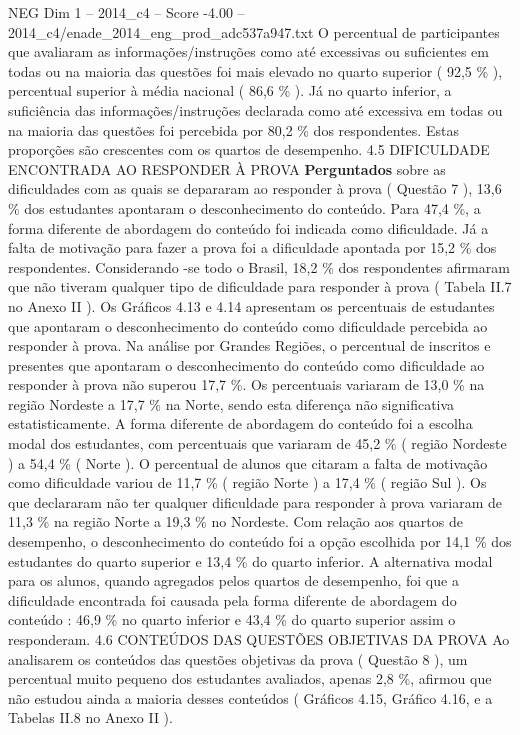 \begin{textsample}{NEG Dim 1 – 2014\_c4 – Score -4.00 – 2014\_c4/enade\_2014\_eng\_prod\_adc537a947.txt}
O percentual de participantes que avaliaram as informações/instruções como até excessivas ou suficientes em todas ou na maioria das questões foi mais elevado no quarto superior ( 92,5 \% ), percentual superior à média nacional ( 86,6 \% ).
Já no quarto inferior, a suficiência das informações/instruções declarada como até excessiva em todas ou na maioria das questões foi percebida por 80,2 \% dos respondentes.
Estas proporções são crescentes com os quartos de desempenho. 4.5 DIFICULDADE ENCONTRADA AO RESPONDER À PROVA \textbf{Perguntados} sobre as dificuldades com as quais se depararam ao responder à prova ( Questão 7 ), 13,6 \% dos estudantes apontaram o desconhecimento do conteúdo.
Para 47,4 \%, a forma diferente de abordagem do conteúdo foi indicada como dificuldade.
Já a falta de motivação para fazer a prova foi a dificuldade apontada por 15,2 \% dos respondentes.
Considerando -se todo o Brasil, 18,2 \% dos respondentes afirmaram que não tiveram qualquer tipo de dificuldade para responder à prova ( Tabela II.7 no Anexo II ).
Os Gráficos 4.13 e 4.14 apresentam os percentuais de estudantes que apontaram o desconhecimento do conteúdo como dificuldade percebida ao responder à prova.
Na análise por Grandes Regiões, o percentual de inscritos e presentes que apontaram o desconhecimento do conteúdo como dificuldade ao responder à prova não superou 17,7 \%.
Os percentuais variaram de 13,0 \% na região Nordeste a 17,7 \% na Norte, sendo esta diferença não significativa estatisticamente.
A forma diferente de abordagem do conteúdo foi a escolha modal dos estudantes, com percentuais que variaram de 45,2 \% ( região Nordeste ) a 54,4 \% ( Norte ).
O percentual de alunos que citaram a falta de motivação como dificuldade variou de 11,7 \% ( região Norte ) a 17,4 \% ( região Sul ).
Os que declararam não ter qualquer dificuldade para responder à prova variaram de 11,3 \% na região Norte a 19,3 \% no Nordeste.
Com relação aos quartos de desempenho, o desconhecimento do conteúdo foi a opção escolhida por 14,1 \% dos estudantes do quarto superior e 13,4 \% do quarto inferior.
A alternativa modal para os alunos, quando agregados pelos quartos de desempenho, foi que a dificuldade encontrada foi causada pela forma diferente de abordagem do conteúdo : 46,9 \% no quarto inferior e 43,4 \% do quarto superior assim o responderam. 4.6 CONTEÚDOS DAS QUESTÕES OBJETIVAS DA PROVA Ao analisarem os conteúdos das questões objetivas da prova ( Questão 8 ), um percentual muito pequeno dos estudantes avaliados, apenas 2,8 \%, afirmou que não estudou ainda a maioria desses conteúdos ( Gráficos 4.15, Gráfico 4.16, e a Tabelas II.8 no Anexo II ).

\end{textsample}
